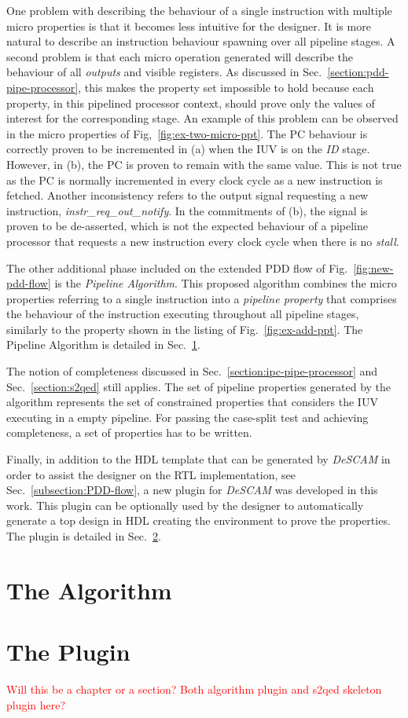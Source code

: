 One problem with describing the behaviour of a single instruction with multiple micro properties is that it becomes less intuitive for the designer. It is more natural to describe an instruction behaviour spawning over all pipeline stages. A second problem is that each micro operation generated will describe the behaviour of all \textit{outputs} and visible registers. As discussed in Sec.~\ref{section:pdd-pipe-processor}, this makes the property set impossible to hold because each property, in this pipelined processor context, should prove only the values of interest for the corresponding stage. An example of this problem can be observed in the micro properties of Fig,~\ref{fig:ex-two-micro-ppt}. The PC behaviour is correctly proven to be incremented in (a) when the IUV is on the \textit{ID} stage. However, in (b), the PC is proven to remain with the same value. This is not true as the PC is normally incremented in every clock cycle as a new instruction is fetched. Another inconsistency refers to the output signal requesting a new instruction, \textit{instr\_req\_out\_notify}. In the  commitments of (b), the signal is proven to be de-asserted, which is not the expected behaviour of a pipeline processor that requests a new instruction every clock cycle when there is no \textit{stall}.

The other additional phase included on the extended PDD flow of Fig.~\ref{fig:new-pdd-flow} is the \textit{Pipeline Algorithm}. This proposed algorithm combines the micro properties referring to a single instruction into a \textit{pipeline property} that comprises the behaviour of the instruction executing throughout all pipeline stages, similarly to the property shown in the listing of Fig.~\ref{fig:ex-add-ppt}. The Pipeline Algorithm is detailed in Sec.~\ref{sectio:pipe-algorithm}.

The notion of completeness discussed in Sec.~\ref{section:ipc-pipe-processor} and Sec.~\ref{section:s2qed} still applies. The set of pipeline properties generated by the algorithm represents the set of constrained properties that considers the IUV executing in a empty pipeline. For passing the case-split test and achieving completeness, a set of \SSQED{} properties has to be written.

Finally, in addition to the HDL template that can be generated by \textit{DeSCAM} in order to assist the designer on the RTL implementation, see Sec.~\ref{subsection:PDD-flow}, a new plugin  for \textit{DeSCAM} was developed in this work. This plugin can be optionally used by the designer to automatically generate a top design in HDL creating the environment to prove the \SSQED{} properties. The plugin is detailed in Sec.~\ref{section:plugio-s2qed-top}.

\section{The Algorithm}
\label{sectio:pipe-algorithm}

\section{The Plugin}
\label{section:plugio-s2qed-top}

\textcolor{red}{Will this be a chapter or a section? Both algorithm plugin and s2qed skeleton plugin here?}